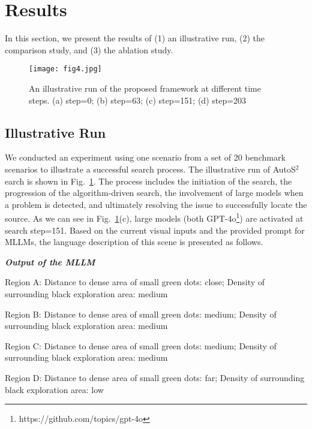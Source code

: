 

\section{Results}
In this section, we present the results of (1) an illustrative run, (2) the comparison study, and (3) the ablation study. 

\begin{figure}[htbp]
    \centering
    \texttt{[image: fig4.jpg]}
    \caption{An illustrative run of the proposed framework at different time steps. (a) step=0; (b) step=63; (c) step=151; (d) step=203}
    \label{fig:Illus}
\end{figure}

\subsection{Illustrative Run} %

We conducted an experiment using one scenario from a set of 20 benchmark scenarios to illustrate a successful search process. The illustrative run of AutoS$^2$earch is shown in Fig.~\ref{fig:Illus}. The process includes the initiation of the search, the progression of the algorithm-driven search, the involvement of large models when a problem is detected, and ultimately resolving the issue to successfully locate the source. As we can see in Fig.~\ref{fig:Illus}(c), large models (both GPT-4o\footnote[2]{https://github.com/topics/gpt-4o}) are activated at search step=151. Based on the current visual inputs and the provided prompt for MLLMs, the language description of this scene is presented as follows. 

\begin{center}
\begin{minipage}{\linewidth}
\begin{shaded}
\textit{\textbf{Output of the MLLM}}

Region A:
Distance to dense area of small green dots: close;
Density of surrounding black exploration area: medium

Region B:
Distance to dense area of small green dots: medium;
Density of surrounding black exploration area: medium

Region C:
Distance to dense area of small green dots: medium;
Density of surrounding black exploration area: medium

Region D:
Distance to dense area of small green dots: far;
Density of surrounding black exploration area: low

\end{shaded}
\end{minipage}
\end{center}


